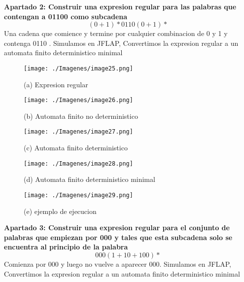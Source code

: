 \documentclass{article}
\begin{document}
        \vspace{\baselineskip} %
        \textbf{Apartado 2: Construir una expresion regular para las palabras que contengan a 01100 como subcadena }
         $$(0+1)*0110(0+1)*$$
        Una cadena que comience y termine por cualquier combinacion de 0 y 1 y contenga 0110
        . Simulamos en JFLAP, Convertimos la expresion regular a un automata finito deterministico minimal

        \begin{figure}[!h]
            \centering
            \texttt{[image: ./Imagenes/image25.png]}
            \label{fig:label4}
            \caption*{(a) Expresion regular}
        \end{figure}

        \begin{figure}[!h]
            \centering
            \texttt{[image: ./Imagenes/image26.png]}
            \label{fig:label4}
            \caption*{(b) Automata finito no deterministico}
        \end{figure}

        \newpage

        \begin{figure}[!h]
            \centering
            \texttt{[image: ./Imagenes/image27.png]}
            \label{fig:label4}
            \caption*{(c) Automata finito  deterministico}
        \end{figure}

        \begin{figure}[!h]
            \centering
            \texttt{[image: ./Imagenes/image28.png]}
            \label{fig:label4}
            \caption*{(d) Automata finito deterministico minimal}
        \end{figure}

        \newpage
        \begin{figure}[!h]
            \centering
            \texttt{[image: ./Imagenes/image29.png]}
            \label{fig:label4}
            \caption*{(e) ejemplo de ejecucion}
        \end{figure}

        \textbf{Apartado 3: Construir una expresion regular para el conjunto de palabras que empiezan por 000 y tales que esta subcadena solo se encuentra al principio de la palabra}
        $$ 000(1+10+100)*$$
        Comienza por 000 y luego no vuelve a aparecer 000. Simulamos en JFLAP, Convertimos la expresion regular a un automata finito deterministico minimal
\end{document}
